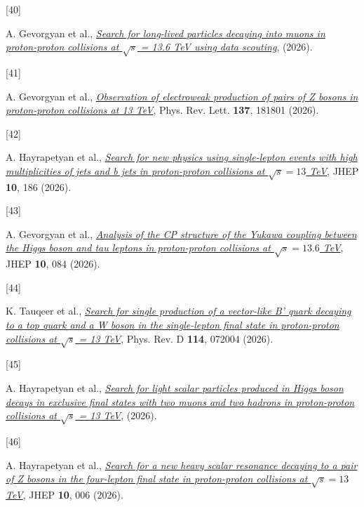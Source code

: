 \documentclass[
]{article}
\newlength{\cslhangindent}
\newlength{\csllabelwidth}
\newenvironment{CSLReferences}[2] %
 {\begin{list}{}{%
  \setlength{\itemindent}{0pt}
  \setlength{\leftmargin}{0pt}
  \setlength{\parsep}{0pt}
  \ifodd #1
   \setlength{\leftmargin}{\cslhangindent}
   \setlength{\itemindent}{-1\cslhangindent}
  \fi
  \setlength{\itemsep}{#2\baselineskip}}}
 {\end{list}}
\newcommand{\CSLLeftMargin}[1]{\parbox[t]{\csllabelwidth}{\strut#1\strut}}
\newcommand{\CSLRightInline}[1]{\parbox[t]{\linewidth - \csllabelwidth}{\strut#1\strut}}
\begin{document}
\begin{CSLReferences}{0}{0}
\CSLLeftMargin{{[}40{]} }%
\CSLRightInline{A. Gevorgyan et al.,
\emph{\href{https://arxiv.org/abs/2606.25840}{{Search for long-lived
particles decaying into muons in proton-proton collisions at
\(\sqrt{s}\) = 13.6 TeV using data scouting}}}, (2026).}

\CSLLeftMargin{{[}41{]} }%
\CSLRightInline{A. Gevorgyan et al.,
\emph{\href{https://doi.org/10.1103/jydv-n2js}{{Observation of
electroweak production of pairs of Z bosons in proton-proton collisions
at 13 TeV}}}, Phys. Rev. Lett. \textbf{137}, 181801 (2026).}

\CSLLeftMargin{{[}42{]} }%
\CSLRightInline{A. Hayrapetyan et al.,
\emph{\href{https://doi.org/10.1007/JHEP10(2026)186}{{Search for new
physics using single-lepton events with high multiplicities of jets and
b jets in proton-proton collisions at \(\sqrt{s}=13\) TeV}}}, JHEP
\textbf{10}, 186 (2026).}

\CSLLeftMargin{{[}43{]} }%
\CSLRightInline{A. Gevorgyan et al.,
\emph{\href{https://doi.org/10.1007/JHEP10(2026)084}{{Analysis of the CP
structure of the Yukawa coupling between the Higgs boson and tau leptons
in proton-proton collisions at \(\sqrt{s}=13.6\) TeV}}}, JHEP
\textbf{10}, 084 (2026).}

\CSLLeftMargin{{[}44{]} }%
\CSLRightInline{K. Tauqeer et al.,
\emph{\href{https://doi.org/10.1103/ktbp-csd3}{{Search for single
production of a vector-like B' quark decaying to a top quark and a W
boson in the single-lepton final state in proton-proton collisions at
\(\sqrt{s}\) = 13 TeV}}}, Phys. Rev. D \textbf{114}, 072004 (2026).}

\CSLLeftMargin{{[}45{]} }%
\CSLRightInline{A. Hayrapetyan et al.,
\emph{\href{https://arxiv.org/abs/2605.27875}{{Search for light scalar
particles produced in Higgs boson decays in exclusive final states with
two muons and two hadrons in proton-proton collisions at \(\sqrt{s}\) =
13 TeV}}}, (2026).}

\CSLLeftMargin{{[}46{]} }%
\CSLRightInline{A. Hayrapetyan et al.,
\emph{\href{https://doi.org/10.1007/JHEP10(2026)006}{{Search for a new
heavy scalar resonance decaying to a pair of Z bosons in the four-lepton
final state in proton-proton collisions at \(\sqrt{s}=13\) TeV}}}, JHEP
\textbf{10}, 006 (2026).}


\end{CSLReferences}
\end{document}
